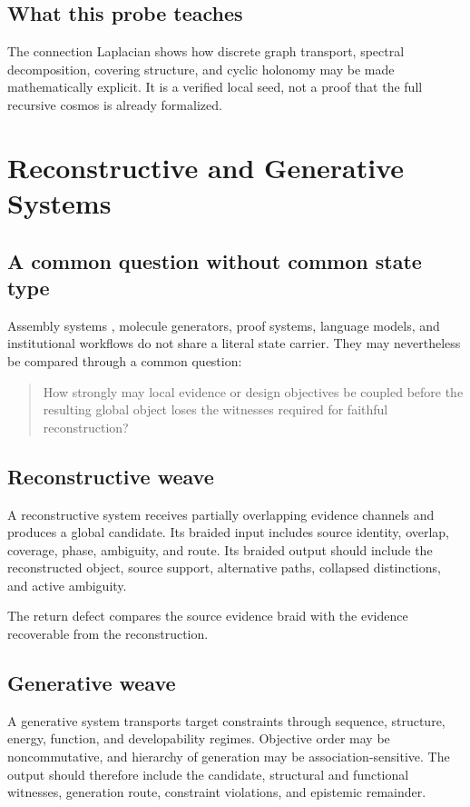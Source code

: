 \documentclass[12pt,openany]{book}
\theoremstyle{remark}
\begin{document}
\section{What this probe teaches}
The connection Laplacian shows how discrete graph transport, spectral decomposition, covering structure, and cyclic holonomy may be made mathematically explicit. It is a verified local seed, not a proof that the full recursive cosmos is already formalized.

\chapter{Reconstructive and Generative Systems}
\label{ch:systems}

\section{A common question without common state type}
Assembly systems \cite{Sharma2023}, molecule generators, proof systems, language models, and institutional workflows do not share a literal state carrier. They may nevertheless be compared through a common question:

\begin{quote}
How strongly may local evidence or design objectives be coupled before the resulting global object loses the witnesses required for faithful reconstruction?
\end{quote}

\section{Reconstructive weave}
A reconstructive system receives partially overlapping evidence channels and produces a global candidate. Its braided input includes source identity, overlap, coverage, phase, ambiguity, and route. Its braided output should include the reconstructed object, source support, alternative paths, collapsed distinctions, and active ambiguity.

The return defect compares the source evidence braid with the evidence recoverable from the reconstruction.

\section{Generative weave}
A generative system transports target constraints through sequence, structure, energy, function, and developability regimes. Objective order may be noncommutative, and hierarchy of generation may be association-sensitive. The output should therefore include the candidate, structural and functional witnesses, generation route, constraint violations, and epistemic remainder.
\end{document}
